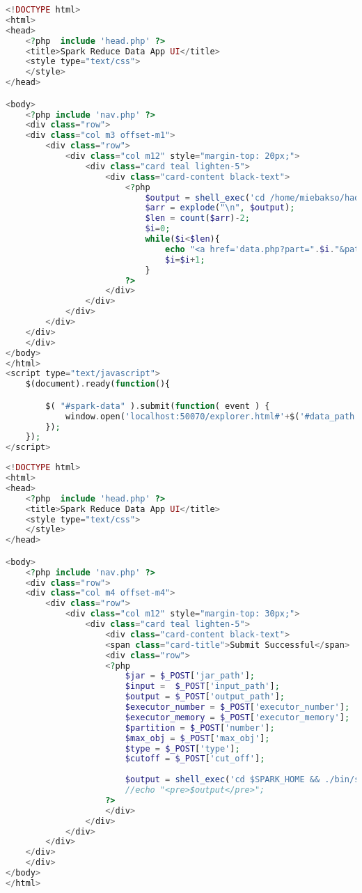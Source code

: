 \begin{lstlisting}[language=PHP, caption=list.php]
<!DOCTYPE html>
<html>
<head>
	<?php  include 'head.php' ?>
	<title>Spark Reduce Data App UI</title>
	<style type="text/css">
	</style>
</head>

<body>
	<?php include 'nav.php' ?>
	<div class="row">
	<div class="col m3 offset-m1">
		<div class="row">
		    <div class="col m12" style="margin-top: 20px;">
		      	<div class="card teal lighten-5">
		        	<div class="card-content black-text">
				      	<?php 
				      		$output = shell_exec('cd /home/miebakso/hadoop-2.7.3 && ./bin/hadoop fs -ls '.$_POST['data_path']);
				      		$arr = explode("\n", $output);
				      		$len = count($arr)-2;
				      		$i=0;
				      		while($i<$len){
								echo "<a href='data.php?part=".$i."&path=".$_POST['data_path']."'>part-".$i."</a><br>";
								$i=$i+1;
							}
				      	?>
				    </div>
				</div>
		    </div>
		</div>   
	</div>
	</div>
</body>
</html>
<script type="text/javascript">
	$(document).ready(function(){

		$( "#spark-data" ).submit(function( event ) {
  			window.open('localhost:50070/explorer.html#'+$('#data_path').val(), '_blank');
		});
	});
</script>
\end{lstlisting}

\begin{lstlisting}[language=PHP, caption=result.php]
<!DOCTYPE html>
<html>
<head>
	<?php  include 'head.php' ?>
	<title>Spark Reduce Data App UI</title>
	<style type="text/css">
	</style>
</head>

<body>
	<?php include 'nav.php' ?>
	<div class="row">
	<div class="col m4 offset-m4">
		<div class="row">
		    <div class="col m12" style="margin-top: 30px;">
		      	<div class="card teal lighten-5">
		        	<div class="card-content black-text">
		          	<span class="card-title">Submit Successful</span>
		          	<div class="row">
				 	<?php
				 		$jar = $_POST['jar_path'];
				 		$input =  $_POST['input_path'];
				 		$output = $_POST['output_path'];
				 		$executor_number = $_POST['executor_number'];
				 		$executor_memory = $_POST['executor_memory'];
				 		$partition = $_POST['number'];
				 		$max_obj = $_POST['max_obj'];
				 		$type = $_POST['type'];
				 		$cutoff = $_POST['cut_off'];
				 		
				 		$output = shell_exec('cd $SPARK_HOME && ./bin/spark-submit --class main.scala.Main --master yarn /home/miebakso/IdeaProjects/BigData/target/scala-2.11/bigdata_2.11-0.1.jar');
						//echo "<pre>$output</pre>";
				 	?>
				 	</div>
		      	</div>
		    </div>
		</div>   
	</div>
	</div>
</body>
</html>
\end{lstlisting}


